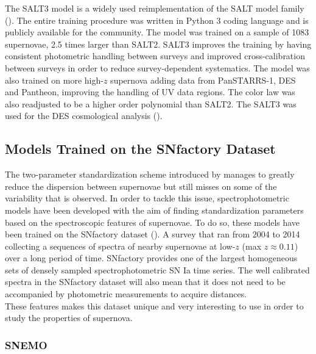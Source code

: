 The SALT3 model is a widely used reimplementation of the SALT model family (\cite{Kenworthy_2021_SALT3}). The entire training procedure was written in Python 3 coding language 
and is publicly available for the community. The model was trained on a 
sample of 1083 supernovae, 2.5 times larger than SALT2. SALT3 improves the training by having consistent photometric handling between surveys and improved cross-calibration between 
surveys in order to reduce survey-dependent systematics. The model was also trained on more high-$z$ supernova adding data from 
PanSTARRS-1, DES and Pantheon, improving the handling of UV data regions. The color law was 
also readjusted to be a higher order polynomial than SALT2. The SALT3 was used for the DES cosmological analysis (\cite{DES_2024}). \\
 

\subsection{Models Trained on the SNfactory Dataset}

The two-parameter standardization scheme introduced by \cite{Tripp_1999} manages to greatly reduce the dispersion between supernovae but still misses on some of the 
variability that is observed. In order to tackle this issue, spectrophotometric models have been developed with the aim of finding standardization parameters based 
on the spectroscopic features of supernovae. To do so, these models have been trained on the SNfactory dataset (\cite{snfactory}). 
A survey that ran from 2004 to 2014 collecting a sequences of spectra of nearby supernovae at low-$z$ (max $z\approx0.11$) over a long period of time. 
SNfactory provides one of the largest homogeneous sets of densely sampled spectrophotometric SN Ia time series. The well calibrated spectra in the SNfactory dataset will also mean 
that it does not need to be accompanied by photometric measurements to acquire distances. \\
These features makes this dataset unique and very interesting to use in order to study the properties of supernova. \\


\subsubsection{SNEMO} 

